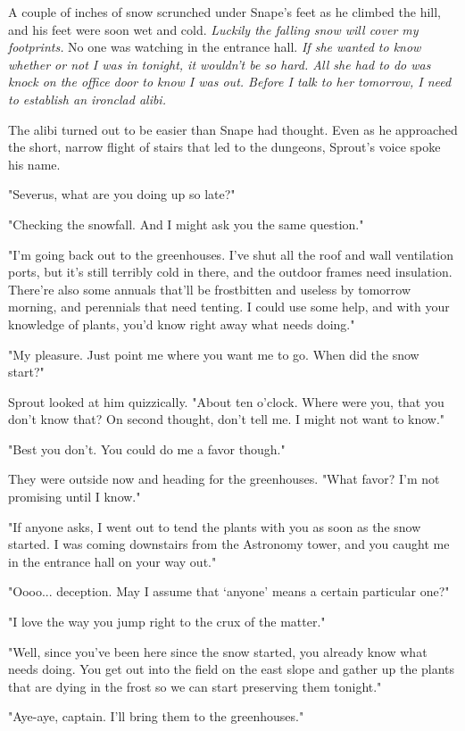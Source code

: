 A couple of inches of snow scrunched under Snape's feet as he climbed the hill, and his feet were soon wet and cold. \emph{Luckily the falling snow will cover my footprints.} No one was watching in the entrance hall. \emph{If she wanted to know whether or not I was in tonight, it wouldn't be so hard. All she had to do was knock on the office door to know I was out. Before I talk to her tomorrow, I need to establish an ironclad alibi.}

The alibi turned out to be easier than Snape had thought. Even as he approached the short, narrow flight of stairs that led to the dungeons, Sprout's voice spoke his name.

"Severus, what are you doing up so late?"

"Checking the snowfall. And I might ask you the same question."

"I'm going back out to the greenhouses. I've shut all the roof and wall ventilation ports, but it's still terribly cold in there, and the outdoor frames need insulation. There're also some annuals that'll be frostbitten and useless by tomorrow morning, and perennials that need tenting. I could use some help, and with your knowledge of plants, you'd know right away what needs doing."

"My pleasure. Just point me where you want me to go. When did the snow start?"

Sprout looked at him quizzically. "About ten o'clock. Where were you, that you don't know that? On second thought, don't tell me. I might not want to know."

"Best you don't. You could do me a favor though."

They were outside now and heading for the greenhouses. "What favor? I'm not promising until I know."

"If anyone asks, I went out to tend the plants with you as soon as the snow started. I was coming downstairs from the Astronomy tower, and you caught me in the entrance hall on your way out."

"Oooo... deception. May I assume that `anyone' means a certain particular one?"

"I love the way you jump right to the crux of the matter."

"Well, since you've been here since the snow started, you already know what needs doing. You get out into the field on the east slope and gather up the plants that are dying in the frost so we can start preserving them tonight."

"Aye-aye, captain. I'll bring them to the greenhouses."

